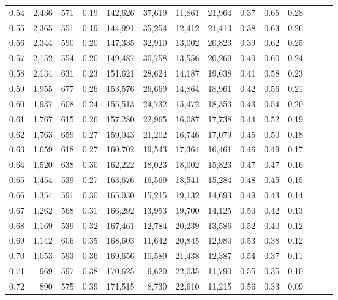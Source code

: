 \begin{tabular}{rrrrrrrrrrrrrr}
0.54 &  2,436 &  571 &  0.19 &  142,626 &   37,619 &  11,861 &  21,964 &  0.37 &  0.65 &      0.28 \\
0.55 &  2,365 &  551 &  0.19 &  144,991 &   35,254 &  12,412 &  21,413 &  0.38 &  0.63 &      0.26 \\
0.56 &  2,344 &  590 &  0.20 &  147,335 &   32,910 &  13,002 &  20,823 &  0.39 &  0.62 &      0.25 \\
0.57 &  2,152 &  554 &  0.20 &  149,487 &   30,758 &  13,556 &  20,269 &  0.40 &  0.60 &      0.24 \\
0.58 &  2,134 &  631 &  0.23 &  151,621 &   28,624 &  14,187 &  19,638 &  0.41 &  0.58 &      0.23 \\
0.59 &  1,955 &  677 &  0.26 &  153,576 &   26,669 &  14,864 &  18,961 &  0.42 &  0.56 &      0.21 \\
0.60 &  1,937 &  608 &  0.24 &  155,513 &   24,732 &  15,472 &  18,353 &  0.43 &  0.54 &      0.20 \\
0.61 &  1,767 &  615 &  0.26 &  157,280 &   22,965 &  16,087 &  17,738 &  0.44 &  0.52 &      0.19 \\
0.62 &  1,763 &  659 &  0.27 &  159,043 &   21,202 &  16,746 &  17,079 &  0.45 &  0.50 &      0.18 \\
0.63 &  1,659 &  618 &  0.27 &  160,702 &   19,543 &  17,364 &  16,461 &  0.46 &  0.49 &      0.17 \\
0.64 &  1,520 &  638 &  0.30 &  162,222 &   18,023 &  18,002 &  15,823 &  0.47 &  0.47 &      0.16 \\
0.65 &  1,454 &  539 &  0.27 &  163,676 &   16,569 &  18,541 &  15,284 &  0.48 &  0.45 &      0.15 \\
0.66 &  1,354 &  591 &  0.30 &  165,030 &   15,215 &  19,132 &  14,693 &  0.49 &  0.43 &      0.14 \\
0.67 &  1,262 &  568 &  0.31 &  166,292 &   13,953 &  19,700 &  14,125 &  0.50 &  0.42 &      0.13 \\
0.68 &  1,169 &  539 &  0.32 &  167,461 &   12,784 &  20,239 &  13,586 &  0.52 &  0.40 &      0.12 \\
0.69 &  1,142 &  606 &  0.35 &  168,603 &   11,642 &  20,845 &  12,980 &  0.53 &  0.38 &      0.12 \\
0.70 &  1,053 &  593 &  0.36 &  169,656 &   10,589 &  21,438 &  12,387 &  0.54 &  0.37 &      0.11 \\
0.71 &    969 &  597 &  0.38 &  170,625 &    9,620 &  22,035 &  11,790 &  0.55 &  0.35 &      0.10 \\
0.72 &    890 &  575 &  0.39 &  171,515 &    8,730 &  22,610 &  11,215 &  0.56 &  0.33 &      0.09 \\

\end{tabular}
